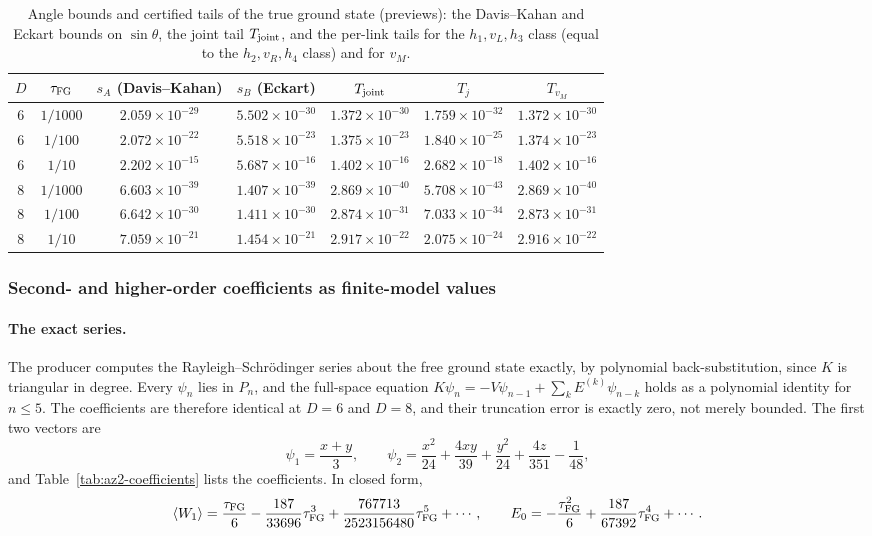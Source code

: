 \begin{table}[htbp]
\centering\small
\caption{Angle bounds and certified tails of the true ground state (previews):
the Davis--Kahan and Eckart bounds on $\sin\theta$, the joint tail
$T_{\rm joint}$, and the per-link tails for the $h_1,v_L,h_3$ class (equal
to the $h_2,v_R,h_4$ class) and for $v_M$.}
\label{tab:az2-tails}
\begin{tabular}{@{}ccccccc@{}}
\toprule
$D$ & $\tau_{\mathrm{FG}}$ & $s_A$ (Davis--Kahan) & $s_B$ (Eckart) & $T_{\rm joint}$ & $T_j$ & $T_{v_M}$\\
\midrule
6 & $1/1000$ & $2.059\times10^{-29}$ & $5.502\times10^{-30}$ & $1.372\times10^{-30}$ & $1.759\times10^{-32}$ & $1.372\times10^{-30}$\\
6 & $1/100$ & $2.072\times10^{-22}$ & $5.518\times10^{-23}$ & $1.375\times10^{-23}$ & $1.840\times10^{-25}$ & $1.374\times10^{-23}$\\
6 & $1/10$ & $2.202\times10^{-15}$ & $5.687\times10^{-16}$ & $1.402\times10^{-16}$ & $2.682\times10^{-18}$ & $1.402\times10^{-16}$\\[2pt]
8 & $1/1000$ & $6.603\times10^{-39}$ & $1.407\times10^{-39}$ & $2.869\times10^{-40}$ & $5.708\times10^{-43}$ & $2.869\times10^{-40}$\\
8 & $1/100$ & $6.642\times10^{-30}$ & $1.411\times10^{-30}$ & $2.874\times10^{-31}$ & $7.033\times10^{-34}$ & $2.873\times10^{-31}$\\
8 & $1/10$ & $7.059\times10^{-21}$ & $1.454\times10^{-21}$ & $2.917\times10^{-22}$ & $2.075\times10^{-24}$ & $2.916\times10^{-22}$\\
\bottomrule
\end{tabular}
\end{table}

\subsubsection{Second- and higher-order coefficients as finite-model values}
\label{sec:az2-coefficients}
\paragraph{The exact series.}
The producer computes the Rayleigh--Schr\"odinger series about the free ground
state exactly, by polynomial back-substitution, since $K$ is triangular in
degree. Every $\psi_n$ lies in $P_n$, and the full-space equation
$K\psi_n=-V\psi_{n-1}+\sum_kE^{(k)}\psi_{n-k}$ holds as a polynomial identity
for $n\le5$. The coefficients are therefore identical at $D=6$ and $D=8$, and
their truncation error is exactly zero, not merely bounded. The first two
vectors are
\begin{equation}
 \psi_1=\frac{x+y}3,\qquad
 \psi_2=\frac{x^2}{24}+\frac{4xy}{39}+\frac{y^2}{24}+\frac{4z}{351}-\frac1{48},
 \label{eq:az2-psi2}
\end{equation}
and Table~\ref{tab:az2-coefficients} lists the coefficients. In closed form,
\begin{equation}
 \langle W_1\rangle=\frac{\tau_{\mathrm{FG}}}6-\frac{187}{33696}\tau_{\mathrm{FG}}^3
 +\frac{767713}{2523156480}\tau_{\mathrm{FG}}^5+\cdots,\qquad
 E_0=-\frac{\tau_{\mathrm{FG}}^2}6+\frac{187}{67392}\tau_{\mathrm{FG}}^4+\cdots .
 \label{eq:az2-series}
\end{equation}

